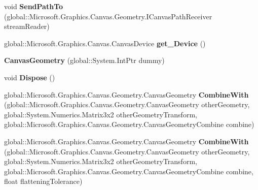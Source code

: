 \begin{DoxyCompactItemize}
\item 
\mbox{\label{class_microsoft_1_1_graphics_1_1_canvas_1_1_geometry_1_1_canvas_geometry_ac6b1c589bbbc82f3130c0f1164401983}} 
void {\bfseries Send\+Path\+To} (global\+::\+Microsoft.\+Graphics.\+Canvas.\+Geometry.\+I\+Canvas\+Path\+Receiver stream\+Reader)
\item 
\mbox{\label{class_microsoft_1_1_graphics_1_1_canvas_1_1_geometry_1_1_canvas_geometry_a5c318bc4d58999fcf66c9bafd45ffe8b}} 
global\+::\+Microsoft.\+Graphics.\+Canvas.\+Canvas\+Device {\bfseries get\+\_\+\+Device} ()
\item 
\mbox{\label{class_microsoft_1_1_graphics_1_1_canvas_1_1_geometry_1_1_canvas_geometry_aa2808482bc01ed6dfc625b6e9d3ef3ca}} 
{\bfseries Canvas\+Geometry} (global\+::\+System.\+Int\+Ptr dummy)
\item 
\mbox{\label{class_microsoft_1_1_graphics_1_1_canvas_1_1_geometry_1_1_canvas_geometry_a6173265c5e6f97788ac9715a18ee8b03}} 
void {\bfseries Dispose} ()
\item 
\mbox{\label{class_microsoft_1_1_graphics_1_1_canvas_1_1_geometry_1_1_canvas_geometry_aaf62c4106c1df76395cb0e89a2663f79}} 
global\+::\+Microsoft.\+Graphics.\+Canvas.\+Geometry.\+Canvas\+Geometry {\bfseries Combine\+With} (global\+::\+Microsoft.\+Graphics.\+Canvas.\+Geometry.\+Canvas\+Geometry other\+Geometry, global\+::\+System.\+Numerics.\+Matrix3x2 other\+Geometry\+Transform, global\+::\+Microsoft.\+Graphics.\+Canvas.\+Geometry.\+Canvas\+Geometry\+Combine combine)
\item 
\mbox{\label{class_microsoft_1_1_graphics_1_1_canvas_1_1_geometry_1_1_canvas_geometry_adad804adc3470601bc8179651be8521e}} 
global\+::\+Microsoft.\+Graphics.\+Canvas.\+Geometry.\+Canvas\+Geometry {\bfseries Combine\+With} (global\+::\+Microsoft.\+Graphics.\+Canvas.\+Geometry.\+Canvas\+Geometry other\+Geometry, global\+::\+System.\+Numerics.\+Matrix3x2 other\+Geometry\+Transform, global\+::\+Microsoft.\+Graphics.\+Canvas.\+Geometry.\+Canvas\+Geometry\+Combine combine, float flattening\+Tolerance)

\end{DoxyCompactItemize}
